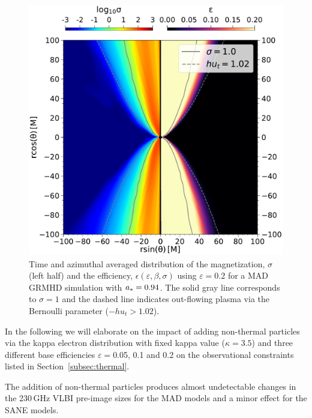 \begin{figure}[t!]
  \centering
  \includegraphics[width=\columnwidth]{./figures/GRMHDphiavera0.94sigmaeta.pdf}
  \caption{Time and azimuthal averaged distribution of the magnetization, $\sigma$ (left half) and the efficiency, $\epsilon(\varepsilon,\beta,\sigma)$ using $\varepsilon=0.2 $ for a \bhac MAD GRMHD simulation with $a_*=0.94$. The solid gray line corresponds to $\sigma=1$ and the dashed line indicates out-flowing plasma via the Bernoulli parameter ($-h u_{t}>1.02$).
  }
  \label{fig:varepsilon}
\end{figure}

In the following we will elaborate on the impact of adding non-thermal particles via the kappa electron distribution with fixed kappa value ($\kappa=3.5$) and three different base efficiencies $\varepsilon=$0.05, 0.1 and 0.2 on the observational constraints listed in Section~\ref{subsec:thermal}.


The addition of non-thermal particles produces almost undetectable changes in the 230\,GHz VLBI pre-image sizes for the MAD models and a minor effect for the SANE models.

